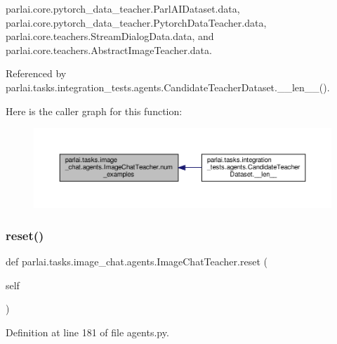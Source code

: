 parlai.\+core.\+pytorch\+\_\+data\+\_\+teacher.\+Parl\+A\+I\+Dataset.\+data, parlai.\+core.\+pytorch\+\_\+data\+\_\+teacher.\+Pytorch\+Data\+Teacher.\+data, parlai.\+core.\+teachers.\+Stream\+Dialog\+Data.\+data, and parlai.\+core.\+teachers.\+Abstract\+Image\+Teacher.\+data.



Referenced by parlai.\+tasks.\+integration\+\_\+tests.\+agents.\+Candidate\+Teacher\+Dataset.\+\_\+\+\_\+len\+\_\+\+\_\+().

Here is the caller graph for this function\+:
\nopagebreak
\begin{figure}[H]
\begin{center}
\leavevmode
\includegraphics[width=350pt]{classparlai_1_1tasks_1_1image__chat_1_1agents_1_1ImageChatTeacher_a79f6d03e7d21be3a61bad00252f8ea66_icgraph}
\end{center}
\end{figure}
\mbox{\label{classparlai_1_1tasks_1_1image__chat_1_1agents_1_1ImageChatTeacher_aa91037220055d54a8d01877ae55a85f2}} 
\subsubsection{\texorpdfstring{reset()}{reset()}}
{\footnotesize\ttfamily def parlai.\+tasks.\+image\+\_\+chat.\+agents.\+Image\+Chat\+Teacher.\+reset (\begin{DoxyParamCaption}\item[{}]{self }\end{DoxyParamCaption})}



Definition at line 181 of file agents.\+py.

\mbox{\label{classparlai_1_1tasks_1_1image__chat_1_1agents_1_1ImageChatTeacher_a5208845ef2ccb323991101b60bf76396}} 
